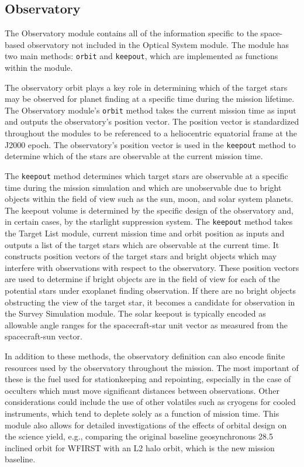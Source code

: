 \documentclass[cleanfoot]{asme2ej}
\begin{document}

\subsection{Observatory}
The Observatory module contains all of the information specific to the space-based observatory not included in the Optical System module. The module has two main methods: \verb+orbit+ and \verb+keepout+, which are implemented as functions within the module. 

The observatory orbit plays a key role in determining which of the target stars may be observed for planet finding at a specific time during the mission lifetime. The Observatory module's \verb+orbit+ method takes the current mission time as input and outputs the observatory's position vector. The position vector is standardized throughout the modules to be referenced to a heliocentric equatorial frame at the J2000 epoch. The observatory's position vector is used in the \verb+keepout+ method to determine which of the stars are observable at the current mission time.

The \verb+keepout+ method determines which target stars are observable at a specific time during the mission simulation and which are unobservable due to bright objects within the field of view such as the sun, moon, and solar system planets.  The keepout volume is determined by the specific design of the observatory and, in certain cases, by the starlight suppression system.  The \verb+keepout+ method takes the Target List module, current mission time and orbit position as inputs and outputs a list of the target stars which are observable at the current time. It constructs position vectors of the target stars and bright objects which may interfere with observations with respect to the observatory. These position vectors are used to determine if bright objects are in the field of view for each of the potential stars under exoplanet finding observation.  If there are no bright objects obstructing the view of the target star, it becomes a candidate for observation in the Survey Simulation module.  The solar keepout is typically encoded as allowable angle ranges for the spacecraft-star unit vector as measured from the spacecraft-sun vector.

In addition to these methods, the observatory definition can also encode finite resources used by the observatory throughout the mission.  The most important of these is the fuel used for stationkeeping and repointing, especially in the case of occulters which must move significant distances between observations.  Other considerations could include the use of other volatiles such as cryogens for cooled instruments, which tend to deplete solely as a function of mission time.  This module also allows for detailed investigations of the effects of orbital design on the science yield, e.g., comparing the original baseline geosynchronous 28.5\textdegree{} inclined orbit for WFIRST with an L2 halo orbit, which is the new mission baseline. 
\end{document}
